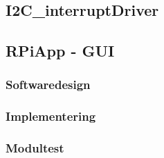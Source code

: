 \documentclass[Rapport/Rapport_main.tex]{subfiles}
\begin{document}
\subsection{I2C\_interruptDriver}




\subsection{RPiApp - GUI}
\subsubsection{Softwaredesign}

\subsubsection{Implementering}

\subsubsection{Modultest}
\end{document}
